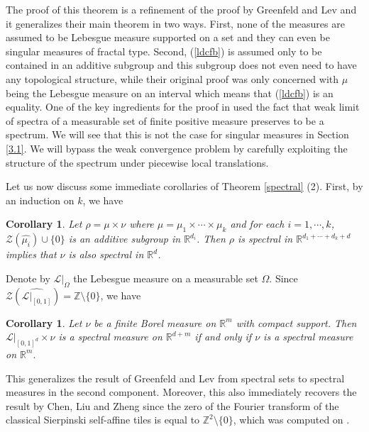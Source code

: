 \documentclass[reqno,a4paper,12pt]{amsart}
\numberwithin{equation}{section}
\newcommand{\R}{{\mathbb R}}
\newcommand{\Z}{{\mathbb Z}}
\newcounter{rem}
\newtheorem{corollary}[theorem]{Corollary}
\theoremstyle{remark}
\numberwithin{equation}{section}
\def\Z{\mathbb{Z}}
\def\R{\mathbb{R}}
\begin{document}
The proof of this theorem is a refinement of the proof by Greenfeld and Lev \cite{GL-JFA} and it generalizes their main theorem in two ways. First, none of the measures are assumed to be Lebesgue measure supported on a set and they can even be singular measures of fractal type. Second, (\ref{ldcfb}) is assumed only to be contained in an additive subgroup and this subgroup does not even need to have any topological structure, while their original proof was only concerned with $\mu$ being the Lebesgue measure on an interval which means that (\ref{ldcfb}) is an equality.  One of the key ingredients for the proof in \cite{GL-JFA} used the fact that weak limit of spectra of a measurable set of finite positive measure preserves to be a spectrum. We will see that this is not the case for singular measures in Section \ref{3.1}. We will bypass the weak convergence problem by carefully exploiting the structure of the spectrum under piecewise local translations. 

Let us now discuss some immediate corollaries of Theorem \ref{spectral} (2). First,   by an induction on $k$, we have  

\begin{corollary}\label{cor-spectral}
    Let $\rho = \mu\times \nu$ where $\mu = \mu_1\times\cdots\times\mu_k$ and for each $i=1,\cdots,k$, ${\mathcal Z}(\widehat{\mu_i})\cup\{0\}$ is an {additive} subgroup in $\R^{d_i}$. Then $\rho$ is spectral in $\R^{d_1+\cdots+d_k+d}$ implies that $\nu$ is also spectral in $\R^{d}$. 
\end{corollary}

 Denote by ${\mathcal L}|_{\Omega}$ the  Lebesgue measure on a measurable set $\Omega$. Since ${\mathcal Z}(\widehat{\mathcal{L}|_{[0,1]}}) = \Z\setminus\{0\}$, we have 
\begin{corollary}\label{interval}
Let $\nu$ be a {finite} Borel measure on $\R^m$ with compact support. Then  $\mathcal{L}|_{[0,1]^d}\times \nu$ is a spectral measure on $\R^{d+m}$ if and only if $\nu$ is a spectral measure on $\R^m.$
\end{corollary}
This generalizes the result of Greenfeld and Lev from spectral sets to spectral measures in the second component.  Moreover, this also immediately recovers the result by Chen, Liu and Zheng \cite{CLZ-JGA} since the zero of the Fourier transform of the classical Sierpinski self-affine tiles is equal to $\Z^2\setminus\{0\}$, which was computed on \cite[p.26]{CLZ-JGA}. 

\medskip
\end{document}
